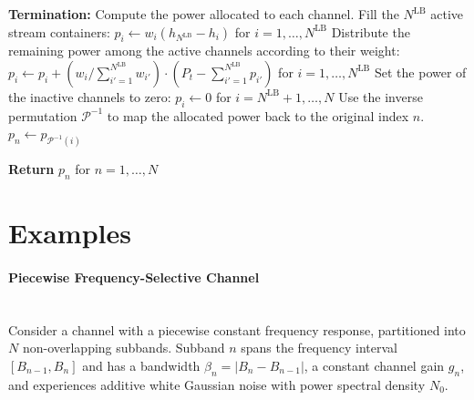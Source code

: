 \begin{algorithm}[!htbp]
\begin{algorithmic}[1]
    \medskip
    \Statex \hspace{-\algorithmicindent}\textbf{Termination:} Compute the power allocated to each channel.
    \Statex \hspace{-\algorithmicindent} Fill the $N^{\mathrm{LB}}$ active stream containers:
    \State $p_i \leftarrow w_i \left(h_{N^{\mathrm{LB}}} - h_i\right)$ \quad for $i = 1, \dots, N^{\mathrm{LB}}$
    \Statex \hspace{-\algorithmicindent} Distribute the remaining power among the active channels according to their weight:
    \State $p_i \leftarrow p_i + (w_i / \textstyle\sum_{i'=1}^{N^{\mathrm{LB}}} w_{i'}) \cdot (P_t - \textstyle\sum_{i'=1}^{N^{\mathrm{LB}}} p_{i'})$ \quad for $i = 1, \dots, N^{\mathrm{LB}}$
    \Statex \hspace{-\algorithmicindent} Set the power of the inactive channels to zero:
    \State $p_i \leftarrow 0$ \quad for $i = N^{\mathrm{LB}} + 1, \dots, N$
    \Statex \hspace{-\algorithmicindent} Use the inverse permutation $\mathcal{P}^{-1}$ to map the allocated power back to the original index $n$.
    \State $p_n \leftarrow p_{\mathcal{P}^{-1}(i)}$
    
    \medskip
    \Statex \hspace{-\algorithmicindent}\textbf{Return} $p_n$ for $n = 1, \dots, N$

\end{algorithmic}
\end{algorithm}


\section{Examples}
\label{appendix_section:waterfilling_examples}

\paragraph{Piecewise Frequency-Selective Channel}~\\
Consider a channel with a piecewise constant frequency response, partitioned into $N$ non-overlapping subbands.
Subband $n$ spans the frequency interval $[B_{n-1}, B_n]$ and has a bandwidth $\beta_n = |B_n - B_{n-1}|$, a constant channel gain $g_n$, and experiences additive white Gaussian noise with power spectral density $N_0$.

